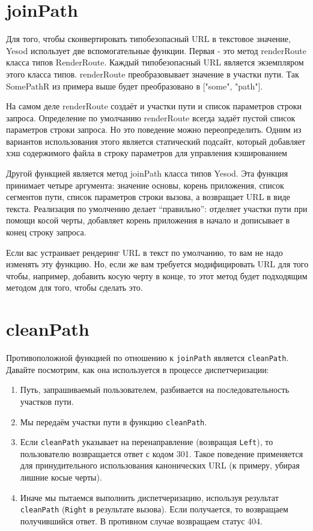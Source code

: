 \section {joinPath}

Для того, чтобы сконвертировать типобезопасный URL в текстовое значение, Yesod использует две вспомогательные функции. Первая - это метод renderRoute класса типов RenderRoute. Каждый типобезопасный URL является экземпляром этого класса типов. renderRoute преобразовывает значение в участки пути. Так SomePathR из примера выше будет преобразовано в ["some", "path"].

\begin{remark}
На самом деле renderRoute создаёт и участки пути и список параметров строки запроса. Определение по умолчанию renderRoute всегда задаёт пустой список параметров строки запроса. Но это поведение можно переопределить. Одним из вариантов использования этого является статический подсайт, который добавляет хэш содержимого файла в строку параметров для управления кэшированием
\end{remark}

Другой функцией является метод joinPath класса типов Yesod. Эта функция принимает четыре аргумента: значение основы, корень приложения, список сегментов пути, список параметров строки вызова, а возвращает URL в виде текста. Реализация по умолчению делает ``правильно'': отделяет участки пути при помощи косой черты, добавляет корень приложения в начало и дописывает в конец строку запроса.

Если вас устраивает рендеринг URL в текст по умолчанию, то вам не надо изменять эту функцию. Но, если же вам требуется модифицировать URL для того чтобы, например, добавить косую черту в конце, то этот метод будет подходящим методом для того, чтобы сделать это.

\section {cleanPath}

Противоположной функцией по отношению к \lstinline!joinPath! является \lstinline!cleanPath!. Давайте посмотрим, как она используется в процессе диспетчеризации:

\begin{enumerate}
  \item Путь, запрашиваемый пользователем, разбивается на последовательность участков пути.
  \item Мы передаём участки пути в функцию \lstinline!cleanPath!.
  \item Если \lstinline!cleanPath! указывает на перенаправление (возвращая \lstinline!Left!), то пользователю возвращается ответ с кодом 301. Такое поведение применяется для принудительного использования канонических URL (к примеру, убирая лишние косые черты).
  \item Иначе мы пытаемся выполнить диспетчеризацию, используя результат \lstinline!cleanPath! (\lstinline!Right! в результате вызова). Если получается, то возвращаем получившийся ответ. В противном случае возвращаем статус 404.
\end{enumerate}

